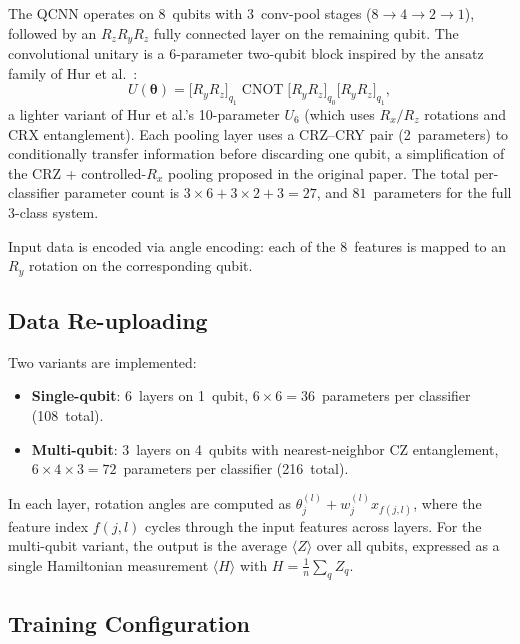 The QCNN operates on 8~qubits with 3~conv-pool stages ($8 \to 4 \to 2 \to 1$), followed by an $R_z R_y R_z$ fully connected layer on the remaining qubit. The convolutional unitary is a 6-parameter two-qubit block inspired by the ansatz family of Hur et al.~\cite{hur2022quantum}:
\[
U(\boldsymbol{\theta}) = \big[R_y R_z\big]_{q_1} \;\text{CNOT}\; \big[R_y R_z\big]_{q_0} \big[R_y R_z\big]_{q_1},
\]
a lighter variant of Hur et al.'s 10-parameter $U_6$ (which uses $R_x/R_z$ rotations and CRX entanglement). Each pooling layer uses a CRZ--CRY pair (2~parameters) to conditionally transfer information before discarding one qubit, a simplification of the CRZ + controlled-$R_x$ pooling proposed in the original paper. The total per-classifier parameter count is $3 \times 6 + 3 \times 2 + 3 = 27$, and $81$~parameters for the full 3-class system.

Input data is encoded via angle encoding: each of the 8~features is mapped to an $R_y$ rotation on the corresponding qubit.

\subsection{Data Re-uploading}

Two variants are implemented:
\begin{itemize}[nosep]
    \item \textbf{Single-qubit}: 6~layers on 1~qubit, $6 \times 6 = 36$~parameters per classifier (108~total).
    \item \textbf{Multi-qubit}: 3~layers on 4~qubits with nearest-neighbor CZ entanglement, $6 \times 4 \times 3 = 72$~parameters per classifier (216~total).
\end{itemize}

In each layer, rotation angles are computed as $\theta_j^{(l)} + w_j^{(l)} x_{f(j,l)}$, where the feature index $f(j,l)$ cycles through the input features across layers. For the multi-qubit variant, the output is the average $\langle Z \rangle$ over all qubits, expressed as a single Hamiltonian measurement $\langle H \rangle$ with $H = \frac{1}{n}\sum_q Z_q$.

\subsection{Training Configuration}

